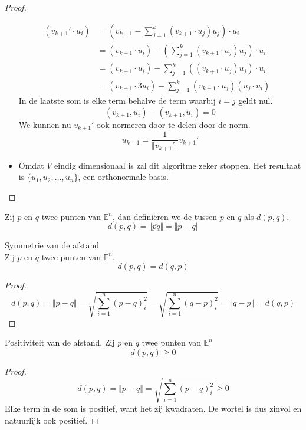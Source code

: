 \documentclass[main.tex]{subfiles}
\begin{document}
\begin{st}
\begin{proof}
\begin{itemize}
      \[
      \begin{array}{rll}
        (v_{k+1}' \cdot u_i) &= \left( v_{k+1} - \sum_{j=1}^k (v_{k+1} \cdot u_j)u_j\right) \cdot u_i &\\
                            &= (v_{k+1} \cdot u_i) - \left( \sum_{j=1}^k (v_{k+1} \cdot u_j)u_j\right) \cdot u_{i} &\\
                            &= (v_{k+1} \cdot u_i) - \sum_{j=1}^k \left((v_{k+1} \cdot u_j) u_j \right) \cdot u_i &\\
                            &= ( v_{k+1} \cdot 3u_i ) - \sum_{j=1}^k (v_{k+1} \cdot u_j ) ( u_j \cdot u_i)
      \end{array}
      \]
      In de laatste som is elke term behalve de term waarbij $i=j$ geldt nul.
      \[
      (v_{k+1},u_i) - (v_{k+1},u_i) = 0
      \]
      We kunnen nu $v_{k+1}'$ ook normeren door te delen door de norm.
      \[
      u_{k+1} = \frac{1}{\Vert v_{k+1}'\Vert}v_{k+1}'
      \]
    \item
      Omdat $V$ eindig dimensionaal is zal dit algoritme zeker stoppen. Het resultaat is $\{u_1,u_2,\ldots,u_n\}$, een orthonormale basis.
    \end{itemize}
  \end{proof}
\end{st}

\begin{de}
  Zij $p$ en $q$ twee punten van $\mathbb{E}^{n}$, dan defini\"eren we de  tussen $p$ en $q$ als $d(p,q)$.
  \[ d(p,q) = \Vert \overline{pq} \Vert = \Vert p-q \Vert \]
\end{de}

\begin{ei}
  \label{ei:symmetrie-afstand}
  Symmetrie van de afstand\\
  Zij $p$ en $q$ twee punten van $\mathbb{E}^{n}$.
  \[ d(p,q) = d(q,p) \]

  \begin{proof}
    \[ d(p,q) = \Vert p-q \Vert = \sqrt{\sum_{i=1}^{n}(p-q)^{2}_{i}} = \sqrt{\sum_{i=1}^{n}(q-p)^{2}_{i}} = \Vert q-p \Vert = d(q,p) \]
  \end{proof}
\end{ei}

\begin{ei}
  \label{ei:afstand-positief}
  Positiviteit van de afstand.
  Zij $p$ en $q$ twee punten van $\mathbb{E}^{n}$
  \[ d(p,q) \ge 0 \]

  \begin{proof}
    \[ d(p,q) = \Vert p-q \Vert = \sqrt{\sum_{i=1}^{n}(p-q)^{2}_{i}} \ge 0 \]
    Elke term in de som is positief, want het zij kwadraten.
    De wortel is dus zinvol en natuurlijk ook positief.
  \end{proof}
\end{ei}
\end{document}
